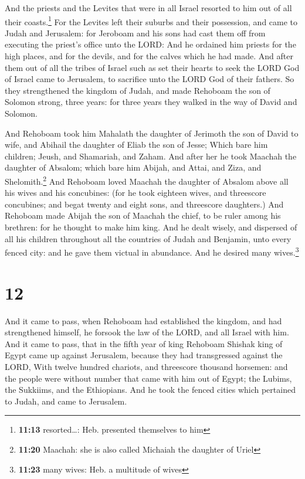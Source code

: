  And the priests and the Levites that were in all Israel
resorted to him out of all their coasts.\footnote{\textbf{11:13}
  resorted\ldots: Heb. presented themselves to him}  For
the Levites left their suburbs and their possession, and came to Judah
and Jerusalem: for Jeroboam and his sons had cast them off from
executing the priest's office unto the LORD:  And he
ordained him priests for the high places, and for the devils, and for
the calves which he had made.  And after them out of all
the tribes of Israel such as set their hearts to seek the LORD God of
Israel came to Jerusalem, to sacrifice unto the LORD God of their
fathers.  So they strengthened the kingdom of Judah, and
made Rehoboam the son of Solomon strong, three years: for three years
they walked in the way of David and Solomon.

 And Rehoboam took him Mahalath the daughter of Jerimoth
the son of David to wife, and Abihail the daughter of Eliab the son of
Jesse;  Which bare him children; Jeush, and Shamariah,
and Zaham.  And after her he took Maachah the daughter of
Absalom; which bare him Abijah, and Attai, and Ziza, and
Shelomith.\footnote{\textbf{11:20} Maachah: she is also called Michaiah
  the daughter of Uriel}  And Rehoboam loved Maachah the
daughter of Absalom above all his wives and his concubines: (for he took
eighteen wives, and threescore concubines; and begat twenty and eight
sons, and threescore daughters.)  And Rehoboam made
Abijah the son of Maachah the chief, to be ruler among his brethren: for
he thought to make him king.  And he dealt wisely, and
dispersed of all his children throughout all the countries of Judah and
Benjamin, unto every fenced city: and he gave them victual in abundance.
And he desired many wives.\footnote{\textbf{11:23} many wives: Heb. a
  multitude of wives}

\hypertarget{section-11}{%
\section{12}\label{section-11}}

 And it came to pass, when Rehoboam had established the
kingdom, and had strengthened himself, he forsook the law of the LORD,
and all Israel with him.  And it came to pass, that in the
fifth year of king Rehoboam Shishak king of Egypt came up against
Jerusalem, because they had transgressed against the LORD,
 With twelve hundred chariots, and threescore thousand
horsemen: and the people were without number that came with him out of
Egypt; the Lubims, the Sukkiims, and the Ethiopians.  And
he took the fenced cities which pertained to Judah, and came to
Jerusalem.

